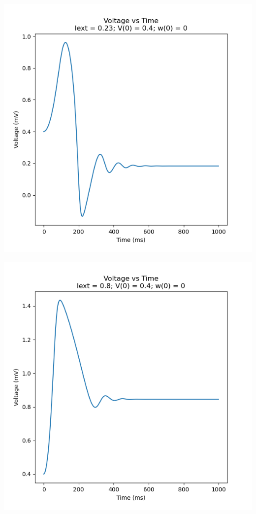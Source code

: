 \documentclass[a4paper, 12pt]{article}
\begin{document}
\begin{minipage}{0.45\linewidth}
    \includegraphics[width=\textwidth]{Q2_1}
    \label{fig:Q2_1}
\end{minipage}
\hfill
\begin{minipage}{0.45\linewidth}
    \includegraphics[width=\textwidth]{Q2_5}
    \label{fig:Q2_5}
\end{minipage}
\end{document}
